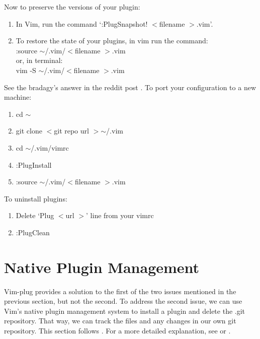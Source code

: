 \documentclass[10pt]{article}
\newcommand{\tsim}{$\sim$}
\newcommand{\tlangle}{$<$}
\newcommand{\trangle}{$>$}
\begin{document}
Now to preserve the versions of your plugin:
\begin{enumerate}
    \item In Vim, run the command `:PlugSnapshot! \tlangle filename \trangle.vim'.
    \item To restore the state of your plugins, in vim run the command:\\
        :source \tsim/.vim/\tlangle filename \trangle.vim\\
        or, in terminal:\\
        vim -S \tsim/.vim/\tlangle filename \trangle.vim
\end{enumerate}
See the bradagy's answer in the reddit post \cite{bradagy2018remember}. To port
your configuration to a new machine:
\begin{enumerate}
    \item cd \tsim
    \item git clone \tlangle git repo url \trangle \tsim/.vim
    \item cd \tsim/.vim/vimrc
    \item :PlugInstall
    \item :source \tsim/.vim/\tlangle filename \trangle.vim
\end{enumerate}
To uninstall plugins:
\begin{enumerate}
    \item Delete `Plug \tlangle url \trangle' line from your vimrc
    \item :PlugClean
\end{enumerate}
\section{Native Plugin Management} \label{SecNativePluginManagement}
Vim-plug provides a solution to the first of the two issues mentioned in the
previous section, but not the second. To address the second issue, we can use
Vim's native plugin management system to install a plugin and delete the .git
repository. That way, we can track the files and any changes in our own git
repository. This section follows \cite{shapeshed2019vim}. For a more
detailed explanation, see \cite{manasthakur2020managing} or \cite{ryder2018attack}.\\
\end{document}
